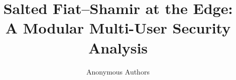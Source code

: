 \usepackage[T1]{fontenc}
\usepackage{lmodern}
\usepackage{microtype}
\usepackage{amsmath,amssymb,mathtools}
\usepackage{booktabs}
\usepackage{array}
\usepackage{graphicx}
\usepackage{xcolor}
\usepackage{tikz}
\usetikzlibrary{arrows.meta,positioning}
\usepackage[hidelinks]{hyperref}
\usepackage[nameinlink,noabbrev,capitalise]{cleveref}


\newcommand{\secpar}[1]{\smallskip\noindent\textbf{#1.}}
\newcommand{\bits}{\{0,1\}}
\newcommand{\N}{\mathbb{N}}
\newcommand{\Z}{\mathbb{Z}}
\newcommand{\G}{\mathbb{G}}
\newcommand{\adv}{\mathcal{A}}
\newcommand{\bdv}{\mathcal{B}}
\newcommand{\chall}{\mathcal{C}}
\newcommand{\hash}{\mathsf{H}}
\newcommand{\kg}{\mathsf{KGen}}
\newcommand{\prove}{\mathsf{Prove}}
\newcommand{\verify}{\mathsf{Vfy}}
\newcommand{\sign}{\mathsf{Sign}}
\newcommand{\vrfy}{\mathsf{Verify}}
\newcommand{\trans}{\mathsf{Trans}}
\newcommand{\acc}{\mathsf{acc}}
\newcommand{\rej}{\mathsf{rej}}
\newcommand{\negl}{\mathsf{negl}}
\newcommand{\poly}{\mathsf{poly}}
\newcommand{\getsr}{\mathrel{\mathop{\leftarrow}\limits^{\$}}}
\newcommand{\Prob}{\Pr}
\newcommand{\Exp}{\mathsf{Exp}}
\DeclareMathOperator{\Adv}{Adv}
\DeclareMathOperator{\Time}{Time}

\title{\texorpdfstring{Salted Fiat--Shamir at the Edge:\\
  A Modular Multi-User Security Analysis}
  {Salted Fiat--Shamir at the Edge: A Modular Multi-User Security Analysis}}

\author{Anonymous Authors}
